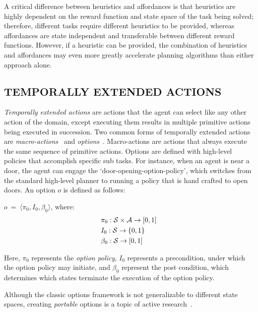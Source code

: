 \documentclass[]{article}
\newcommand{\jmnote}[1]{\textcolor{Green}{\textbf{JM: #1}}}
\begin{document}
A critical difference between heuristics and affordances is that heuristics are highly dependent on the reward function and state space of the task being solved; therefore, different tasks require different heuristics to be provided, whereas affordances are state independent and transferable between different reward functions. However, if a heuristic can be provided, the combination of heuristics and affordances may even more greatly accelerate planning algorithms than either approach alone.


\subsection{TEMPORALLY EXTENDED ACTIONS}

{\em Temporally extended actions} are actions that the agent can
select like any other action of the domain, except executing them
results in multiple primitive actions being executed in
succession. Two common forms of temporally extended actions are {\em
  macro-actions}%
  ~and {\em
  options}~\citep{sutton99}. Macro-actions are actions that always
execute the same sequence of primitive actions. Options are defined
with high-level policies that accomplish specific sub tasks. For
instance, when an agent is near a door, the agent can engage the
`door-opening-option-policy', which switches from the standard
high-level planner to running a policy that is hand crafted to open
doors. An option $o$ is defined as follows:

$o\ =\ \langle \pi_0, I_0, \beta_0\rangle$, where:
\begin{align*}
&\pi_0 : {\cal S} \times {\cal A} \rightarrow [0,1] \\
&I_0 : {\cal S} \rightarrow \{0,1\} \\
&\beta_0 : {\cal S} \rightarrow [0,1]
\end{align*}

Here, $\pi_0$ represents the {\it option policy}, $I_0$ represents
a precondition, under which the option policy may initiate, and 
$\beta_0$ represent the post condition, which determines which 
states terminate the execution of the option policy.

Although the classic options framework is not generalizable to different state spaces,
creating {\em portable} options is a topic of active research~\citep{konidaris07,konidaris2009efficient,Ravindran03analgebraic,croonenborghs2008learning,andre2002state,konidaris2012transfer}.
\end{document}
